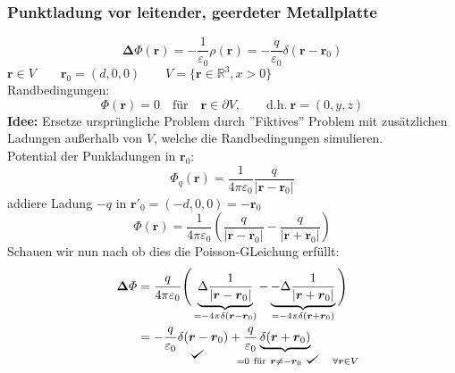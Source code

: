 \documentclass[titlepage,11pt,a4paper,ngerman]{report}
\def\checkmark{\tikz\fill[scale=0.4](0,.35) -- (.25,0) -- (1,.7) -- (.25,.15) -- cycle;}
\newcommand{\tx}[1]{\textrm{#1}}
\newcommand{\ub}[1]{\underbrace{#1}}
\newcommand{\pofr}{\Phi(\vec{r})}
\renewcommand{\Phi}{\varPhi}
\newcommand{\kq}{\frac{1}{4\pi\epsilon_0}}
\renewcommand{\vec}[1]{\boldsymbol{#1}}
\renewcommand{\epsilon}{\varepsilon}
\begin{document}
\subsubsection{Punktladung vor leitender, geerdeter Metallplatte}


\begin{equation*}
\vec{\Delta} \Phi(\vec{r}) = - \frac{1}{\epsilon_0} \rho (\vec{r}) = - \frac{q}{\epsilon_0} \delta(\vec{r} - \vec{r}_0)
\end{equation*}
$ \vec{r} \in V  \qquad \vec{r}_0 = (d,0,0) \qquad V = \{\vec{r} \in \mathbb{R}^3 , x > 0\}$\\
Randbedingungen:
\begin{equation*}
\pofr = 0 \quad \tx{für} \quad \vec{r} \in \partial V ,\quad \quad \tx{d.h.} \ \vec{r} = (0,y,z)
\end{equation*}
\textbf{Idee:} Ersetze ursprüngliche Problem durch ''Fiktives'' Problem mit zusätzlichen Ladungen außerhalb von $V$, welche die Randbedingungen simulieren.\\[5pt]
Potential der Punkladungen in $\vec{r}_0$:
$$\Phi_q (\vec{r}) = \kq \frac{q}{|\vec{r} - \vec{r}_0|}$$ 
addiere Ladung $-q$ in $\vec{r}'_0 = (-d, 0, 0) = -\vec{r}_0$\\[5pt]

\begin{equation*}
\pofr = \kq \left( \frac{q}{|\vec{r} - \vec{r}_0|} - \frac{q}{|\vec{r}+\vec{r}_0|} \right)
\end{equation*}
Schauen wir nun nach ob dies die Poisson-GLeichung erfüllt:
\begin{align*}
\vec{\Delta} \Phi &= \frac{q}{4 \pi \epsilon_0} \Bigg( \ub{\Delta \frac{1}{|\vec{r} - \vec{r}_0|}}_{= - 4 \pi \delta(\vec{r} - \vec{r}_0)} - \ub{- \Delta \frac{1}{|\vec{r} + \vec{r}_0|}}_{= - 4 \pi \delta(\vec{r} + \vec{r}_0)}\Bigg)\\
&= \underset{\checkmark}{- \frac{q}{\epsilon_0} \delta(\vec{r} - \vec{r}_0)} + \frac{q}{\epsilon_0} \ub{\delta(\vec{r} + \vec{r}_0)}_{\mathclap{\qquad = 0 \ \tx{für} \ \vec{r} \neq - \vec{r}_0 \ \checkmark \quad \forall \vec{r} \in V}}
\end{align*}
\end{document}
